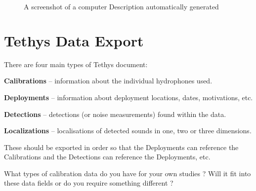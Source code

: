 \documentclass[
]{article}
\begin{document}
\begin{figure}


\caption{\label{fig-array}A screenshot of a computer Description
automatically generated}

\end{figure}%

\section{Tethys Data Export}\label{tethys-data-export}

There are four main types of Tethys document:

\textbf{Calibrations} -- information about the individual hydrophones
used.

\textbf{Deployments} -- information about deployment locations, dates,
motivations, etc.

\textbf{Detections} -- detections (or noise measurements) found within
the data.

\textbf{Localizations} -- localisations of detected sounds in one, two
or three dimensions.

These should be exported in order so that the Deployments can reference
the Calibrations and the Detections can reference the Deployments, etc.

\begin{tcolorbox}[enhanced jigsaw, titlerule=0mm, rightrule=.15mm, opacitybacktitle=0.6, breakable, colframe=quarto-callout-tip-color-frame, coltitle=black, toptitle=1mm, bottomtitle=1mm, colback=white, title=\textcolor{quarto-callout-tip-color}{\faLightbulb}\hspace{0.5em}{No promises, but there is no harm in asking \ldots{}}, arc=.35mm, bottomrule=.15mm, left=2mm, leftrule=.75mm, toprule=.15mm, colbacktitle=quarto-callout-tip-color!10!white, opacityback=0]

What types of calibration data do you have for your own studies ? Will
it fit into these data fields or do you require something different ?

\end{tcolorbox}
\end{document}
